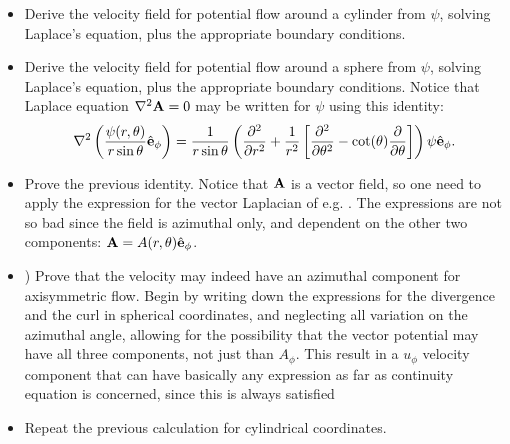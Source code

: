 \begin{itemize}
\item \label{ex:u_from_psi_cylinder} Derive the velocity field for
  potential flow around a cylinder from $\psi$, solving Laplace's
  equation, plus the appropriate boundary conditions.

  
\item \label{ex:u_from_psi_sphere} Derive the velocity field for
  potential flow around a sphere from $\psi$, solving Laplace's
  equation, plus the appropriate boundary conditions. Notice that
  Laplace equation $\nabla^2 \mathbf{A} = 0$ may be written for $\psi$ using
  this identity:
  \begin{equation}
    \label{eq:psi_eq_from_A}
    \nabla^2 \left(  \frac{\psi(r,\theta)}{r \sin\theta } \hat{\mathbf{e}}_\phi \right) =
    \frac{1}{r \sin\theta } 
    \left(
      \frac{\partial^2  }{\partial r^2} +
      \frac{1}{r^2} \left[
        \frac{\partial^2 }{\partial \theta^2} - 
        \cot(\theta) \frac{\partial }{\partial \theta}
      \right]
    \right) \psi \hat{\mathbf{e}}_\phi .
  \end{equation}

\item Prove the previous identity. Notice that $\mathbf{A}$ is a vector
  field, so one need to apply the expression for the vector Laplacian
  of e.g. \cite{wiki:del}. The expressions are not so bad since the
  field is azimuthal only, and dependent on the other two components:
  $ \mathbf{A} = A(r,\theta) \hat{\mathbf{e}}_\phi$.

\item  \label{ex:azimuthal_velocity}) Prove that the velocity
may indeed have an azimuthal component for axisymmetric flow. Begin by writing down the
expressions for the divergence and the curl in spherical coordinates,
and neglecting all variation on the azimuthal angle, allowing for the
possibility that the vector potential may have all three components, not just than $A_\phi$.
This result in a $u_\phi$ velocity component that can have basically any expression
as far as continuity equation is concerned, since this is always satisfied

\item  Repeat the previous calculation for cylindrical coordinates.



\end{itemize}



